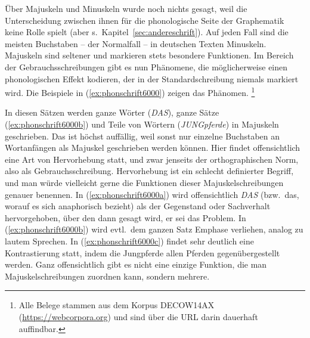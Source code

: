 \label{sec:hervorhebung}

Über Majuskeln und Minuskeln wurde noch nichts gesagt, weil die Unterscheidung zwischen ihnen für die phonologische Seite der Graphematik keine Rolle spielt (aber s.\ Kapitel~\ref{sec:andereschrift}).
Auf jeden Fall sind die meisten Buchstaben -- der Normalfall -- in deutschen Texten Minuskeln.
Majuskeln sind seltener und markieren stets besondere Funktionen.
Im Bereich der Gebrauchsschreibungen gibt es nun Phänomene, die möglicherweise einen phonologischen Effekt kodieren, der in der Standardschreibung niemals markiert wird.
Die Beispiele in (\ref{ex:phonschrift6000}) zeigen das Phänomen.%
\footnote{Alle Belege stammen aus dem Korpus DECOW14AX (\url{https://webcorpora.org}) und sind über die URL darin dauerhaft auffindbar.}

\begin{exe}
  \ex\label{ex:phonschrift6000} 
  \begin{xlist}
  \end{xlist}
\end{exe}

In diesen Sätzen werden ganze Wörter (\textit{DAS}), ganze Sätze (\ref{ex:phonschrift6000b}) und Teile von Wörtern (\textit{JUNGpferde}) in Majuskeln geschrieben.
Das ist höchst auffällig, weil sonst nur einzelne Buchstaben an Wortanfängen als Majuskel geschrieben werden können.
Hier findet offensichtlich eine Art von Hervorhebung statt, und zwar jenseits der orthographischen Norm, also als Gebrauchsschreibung.
Hervorhebung ist ein schlecht definierter Begriff, und man würde vielleicht gerne die Funktionen dieser Majuskelschreibungen genauer benennen.
In (\ref{ex:phonschrift6000a}) wird offensichtlich \textit{DAS} (bzw.\ das, worauf es sich anaphorisch bezieht) als der Gegenstand oder Sachverhalt hervorgehoben, über den dann gesagt wird, er sei das Problem.
In (\ref{ex:phonschrift6000b}) wird evtl.\ dem ganzen Satz Emphase verliehen, analog zu lautem Sprechen.
In (\ref{ex:phonschrift6000c}) findet sehr deutlich eine Kontrastierung statt, indem die Jungpferde allen Pferden gegenübergestellt werden.
Ganz offensichtlich gibt es nicht eine einzige Funktion, die man Majuskelschreibungen zuordnen kann, sondern mehrere.

